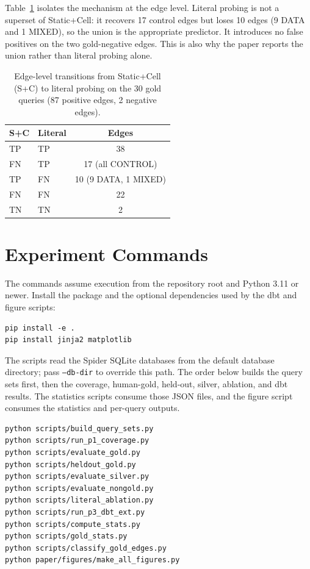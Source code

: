 \documentclass[sigconf, nonacm]{acmart}
\begin{document}
Table~\ref{tab:transition} isolates the mechanism at the edge level. Literal probing is not a superset of Static+Cell: it recovers 17 control edges but loses 10 edges (9 DATA and 1 MIXED), so the union is the appropriate predictor. It introduces no false positives on the two gold-negative edges. This is also why the paper reports the union rather than literal probing alone.





\begin{table}[h!]
\centering
\small
\caption{Edge-level transitions from Static+Cell (S+C) to literal probing on the 30 gold queries (87 positive edges, 2 negative edges).}
\label{tab:transition}
\begin{tabular}{llc}
\toprule
S+C & Literal & Edges \\
\midrule
TP & TP & 38 \\
FN & TP & 17 (all CONTROL) \\
TP & FN & 10 (9 DATA, 1 MIXED) \\
FN & FN & 22 \\
TN & TN & 2 \\
\bottomrule
\end{tabular}
\end{table}

\section{Experiment Commands}
\label{app:commands}

The commands assume execution from the repository root and Python 3.11 or newer. Install the package and the optional dependencies used by the dbt and figure scripts:
\begin{verbatim}
pip install -e .
pip install jinja2 matplotlib
\end{verbatim}
The scripts read the Spider SQLite databases from the default database directory; pass \texttt{--db-dir} to override this path. The order below builds the query sets first, then the coverage, human-gold, held-out, silver, ablation, and dbt results. The statistics scripts consume those JSON files, and the figure script consumes the statistics and per-query outputs.

\begin{verbatim}
python scripts/build_query_sets.py
python scripts/run_p1_coverage.py
python scripts/evaluate_gold.py
python scripts/heldout_gold.py
python scripts/evaluate_silver.py
python scripts/evaluate_nongold.py
python scripts/literal_ablation.py
python scripts/run_p3_dbt_ext.py
python scripts/compute_stats.py
python scripts/gold_stats.py
python scripts/classify_gold_edges.py
python paper/figures/make_all_figures.py
\end{verbatim}
\end{document}
